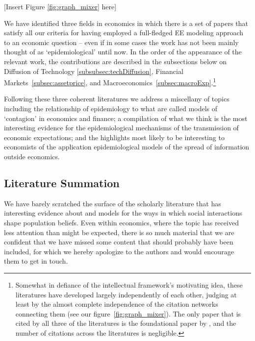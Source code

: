     [Insert Figure \ref{fig:graph_mixer} here]

We have identified three fields in economics in which there is a set of papers that satisfy all our criteria for having employed a full-fledged EE modeling approach to an economic question -- even if in some cases the work has not been mainly thought of as `epidemiological' until now.  In the order of the  appearance of the relevant work, the contributions are described in the subsections below on Diffusion of Technology \ref{subsubsec:techDiffusion}, Financial Markets~\ref{subsec:assetprice}, and Macroeconomics~\ref{subsec:macroExp}.\footnote{Somewhat in defiance of the intellectual framework's motivating idea, these literatures have developed largely independently of each other, judging at least by the almost complete independence of the citation networks connecting them (see our figure~\ref{fig:graph_mixer}). The only paper that is cited by all three of the literatures is the foundational paper by \cite{kermack_contribution_1927}, and the number of citations across the literatures is negligible.}

Following these three coherent literatures we address a miscellany of topics including the relationship of epidemiology to what are called models of `contagion' in economics and finance; a compilation of what we think is the most interesting evidence for the epidemiological mechanisms of the transmission of economic expectations; and the highlights most likely to be interesting to economists of the application epidemiological models of the spread of information outside economics.



\subsection{Literature Summation}

We have barely scratched the surface of the scholarly literature that has interesting evidence about and models for the ways in which social interactions shape population beliefs.  Even within economics, where the topic has received less attention than might be expected, there is so much material that we are confident that we have missed some content that should probably have been included, for which we hereby apologize to the authors and would encourage them to get in touch.


